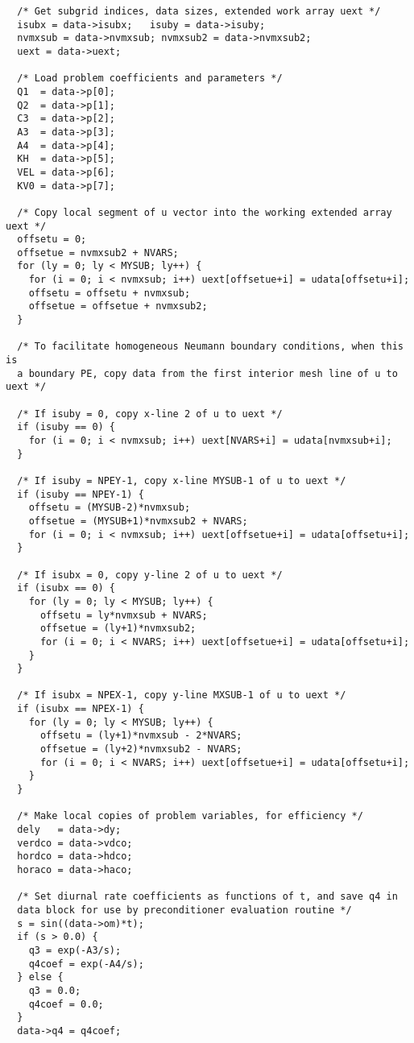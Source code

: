 \begin{verbatim}
  /* Get subgrid indices, data sizes, extended work array uext */
  isubx = data->isubx;   isuby = data->isuby;
  nvmxsub = data->nvmxsub; nvmxsub2 = data->nvmxsub2;
  uext = data->uext;

  /* Load problem coefficients and parameters */
  Q1  = data->p[0];
  Q2  = data->p[1];
  C3  = data->p[2];
  A3  = data->p[3];
  A4  = data->p[4];
  KH  = data->p[5];
  VEL = data->p[6];
  KV0 = data->p[7];

  /* Copy local segment of u vector into the working extended array uext */
  offsetu = 0;
  offsetue = nvmxsub2 + NVARS;
  for (ly = 0; ly < MYSUB; ly++) {
    for (i = 0; i < nvmxsub; i++) uext[offsetue+i] = udata[offsetu+i];
    offsetu = offsetu + nvmxsub;
    offsetue = offsetue + nvmxsub2;
  }

  /* To facilitate homogeneous Neumann boundary conditions, when this is
  a boundary PE, copy data from the first interior mesh line of u to uext */

  /* If isuby = 0, copy x-line 2 of u to uext */
  if (isuby == 0) {
    for (i = 0; i < nvmxsub; i++) uext[NVARS+i] = udata[nvmxsub+i];
  }

  /* If isuby = NPEY-1, copy x-line MYSUB-1 of u to uext */
  if (isuby == NPEY-1) {
    offsetu = (MYSUB-2)*nvmxsub;
    offsetue = (MYSUB+1)*nvmxsub2 + NVARS;
    for (i = 0; i < nvmxsub; i++) uext[offsetue+i] = udata[offsetu+i];
  }

  /* If isubx = 0, copy y-line 2 of u to uext */
  if (isubx == 0) {
    for (ly = 0; ly < MYSUB; ly++) {
      offsetu = ly*nvmxsub + NVARS;
      offsetue = (ly+1)*nvmxsub2;
      for (i = 0; i < NVARS; i++) uext[offsetue+i] = udata[offsetu+i];
    }
  }

  /* If isubx = NPEX-1, copy y-line MXSUB-1 of u to uext */
  if (isubx == NPEX-1) {
    for (ly = 0; ly < MYSUB; ly++) {
      offsetu = (ly+1)*nvmxsub - 2*NVARS;
      offsetue = (ly+2)*nvmxsub2 - NVARS;
      for (i = 0; i < NVARS; i++) uext[offsetue+i] = udata[offsetu+i];
    }
  }

  /* Make local copies of problem variables, for efficiency */
  dely   = data->dy;
  verdco = data->vdco;
  hordco = data->hdco;
  horaco = data->haco;

  /* Set diurnal rate coefficients as functions of t, and save q4 in 
  data block for use by preconditioner evaluation routine */
  s = sin((data->om)*t);
  if (s > 0.0) {
    q3 = exp(-A3/s);
    q4coef = exp(-A4/s);
  } else {
    q3 = 0.0;
    q4coef = 0.0;
  }
  data->q4 = q4coef;


\end{verbatim}
